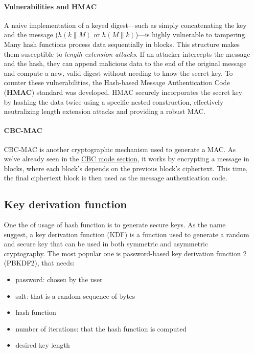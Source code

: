 \paragraph{Vulnerabilities and HMAC}
A naive implementation of a keyed digest---such as simply concatenating the key and the message ($h(k \parallel M)$ or $h(M \parallel k)$)---is highly vulnerable to tampering. Many hash functions process data sequentially in blocks. This structure makes them susceptible to \textit{length extension attacks}. If an attacker intercepts the message and the hash, they can append malicious data to the end of the original message and compute a new, valid digest without needing to know the secret key.
To counter these vulnerabilities, the Hash-based Message Authentication Code (\textbf{HMAC}) standard was developed. HMAC securely incorporates the secret key by hashing the data twice using a specific nested construction, effectively neutralizing length extension attacks and providing a robust MAC.

\paragraph{CBC-MAC}
CBC-MAC is another cryptographic mechanism used to generate a MAC. As we've already seen in the \hyperref[mode:CBC]{CBC mode section}, it works by encrypting a message in blocks, where each block's depends on the previous block's ciphertext. This time, the final ciphertext block is then used as the message authentication code.


\subsection{Key derivation function}
One the of usage of hash function is to generate secure keys. As the name suggest, a key derivation function (KDF) is a function used to generate a random and secure key that can be used in both symmetric and asymmetric cryptography. The most popular one is password-based key derivation function 2 (PBKDF2), that needs:

\begin{itemize}
    \item password: chosen by the user
    \item salt: that is a random sequence of bytes
    \item hash function
    \item number of iterations: that the hash function is computed
    \item desired key length
\end{itemize}


